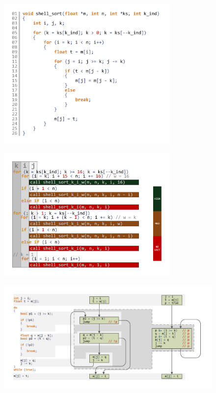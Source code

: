\begin{figure}[ht]
	\centering
		\includegraphics[width=0.8\textwidth]{./pics/text_4_vec_irreg/shell_code.pdf}
	\caption{}
	\label{fig:text_4_vec_irreg_shell_code}
\end{figure}

\begin{figure}[ht]
	\centering
		\includegraphics[width=0.8\textwidth]{./pics/text_4_vec_irreg/code_decomp.pdf}
	\caption{}
	\label{fig:text_4_vec_irreg_code_decomp}
\end{figure}

\begin{figure}[ht]
	\centering
		\includegraphics[width=1.0\textwidth]{./pics/text_4_vec_irreg/shell_cfg.pdf}
	\caption{}
	\label{fig:text_4_vec_irreg_shell_cfg}
\end{figure}

